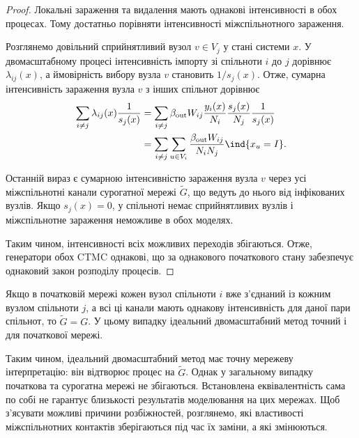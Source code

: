 \begin{proof}
Локальні зараження та видалення мають однакові інтенсивності в обох процесах. Тому достатньо порівняти інтенсивності міжспільнотного зараження.

Розглянемо довільний сприйнятливий вузол $v\in V_j$ у стані системи $x$. У двомасштабному процесі інтенсивність імпорту зі спільноти $i$ до $j$ дорівнює $\lambda_{ij}(x)$, а ймовірність вибору вузла $v$ становить $1/s_j(x)$. Отже, сумарна інтенсивність зараження вузла $v$ з інших спільнот дорівнює
\[
\begin{aligned}
\sum_{i\neq j}\lambda_{ij}(x)\frac{1}{s_j(x)}
&=
\sum_{i\neq j}
\beta_{\mathrm{out}}W_{ij}
\frac{y_i(x)}{N_i}
\frac{s_j(x)}{N_j}
\frac{1}{s_j(x)}
\\
&=
\sum_{i\neq j}
\sum_{u\in V_i}
\frac{\beta_{\mathrm{out}}W_{ij}}{N_iN_j}
\ind\{x_u=I\}.
\end{aligned}
\]

Останній вираз є сумарною інтенсивністю зараження вузла $v$ через усі міжспільнотні канали сурогатної мережі $\tilde G$, що ведуть до нього від інфікованих вузлів. Якщо $s_j(x)=0$, у спільноті немає сприйнятливих вузлів і міжспільнотне зараження неможливе в обох моделях.

Таким чином, інтенсивності всіх можливих переходів збігаються. Отже, генератори обох CTMC однакові, що за однакового початкового стану забезпечує однаковий закон розподілу процесів.
\end{proof}

\begin{corollary}
\label{cor:exact}
Якщо в початковій мережі кожен вузол спільноти $i$ вже з'єднаний із кожним вузлом спільноти $j$, а всі ці канали мають однакову інтенсивність для даної пари спільнот, то $\tilde G=G$. У цьому випадку ідеальний двомасштабний метод точний і для початкової мережі.
\end{corollary}

Таким чином, ідеальний двомасштабний метод має точну мережеву інтерпретацію: він відтворює процес на $\tilde G$. Однак у загальному випадку початкова та сурогатна мережі не збігаються. Встановлена еквівалентність сама по собі не гарантує близькості результатів моделювання на цих мережах. Щоб з'ясувати можливі причини розбіжностей, розглянемо, які властивості міжспільнотних контактів зберігаються під час їх заміни, а які змінюються.







